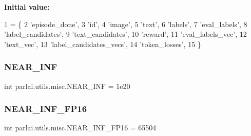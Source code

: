 {\bfseries Initial value\+:}
\begin{DoxyCode}
1 =  \{
2     \textcolor{stringliteral}{'episode\_done'},
3     \textcolor{stringliteral}{'id'},
4     \textcolor{stringliteral}{'image'},
5     \textcolor{stringliteral}{'text'},
6     \textcolor{stringliteral}{'labels'},
7     \textcolor{stringliteral}{'eval\_labels'},
8     \textcolor{stringliteral}{'label\_candidates'},
9     \textcolor{stringliteral}{'text\_candidates'},
10     \textcolor{stringliteral}{'reward'},
11     \textcolor{stringliteral}{'eval\_labels\_vec'},
12     \textcolor{stringliteral}{'text\_vec'},
13     \textcolor{stringliteral}{'label\_candidates\_vecs'},
14     \textcolor{stringliteral}{'token\_losses'},
15 \}
\end{DoxyCode}
\mbox{\label{namespaceparlai_1_1utils_1_1misc_a7f43cea0de3a37889ef23f275831ff92}} 
\subsubsection{\texorpdfstring{N\+E\+A\+R\+\_\+\+I\+NF}{NEAR\_INF}}
{\footnotesize\ttfamily int parlai.\+utils.\+misc.\+N\+E\+A\+R\+\_\+\+I\+NF = 1e20}

\mbox{\label{namespaceparlai_1_1utils_1_1misc_a8f8b31dbd6331077648288e004f45ff9}} 
\subsubsection{\texorpdfstring{N\+E\+A\+R\+\_\+\+I\+N\+F\+\_\+\+F\+P16}{NEAR\_INF\_FP16}}
{\footnotesize\ttfamily int parlai.\+utils.\+misc.\+N\+E\+A\+R\+\_\+\+I\+N\+F\+\_\+\+F\+P16 = 65504}

\mbox{\label{namespaceparlai_1_1utils_1_1misc_a5d6ad7f3aef96f16bb9060f5a41fc39b}} 

